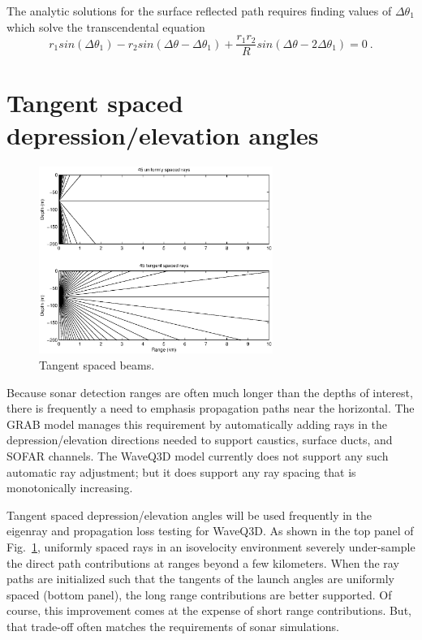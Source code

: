 \documentclass{ws-jca}
\begin{document}
The analytic solutions for the surface reflected path requires finding values of \( \Delta \theta_1 \) which solve the transcendental equation
\begin{equation}
	r_1 sin( \Delta \theta_1 ) - r_2 sin( \Delta \theta - \Delta \theta_1 ) 
		+ \frac{r_1 r_2}{R} sin( \Delta \theta - 2 \Delta \theta_1 ) = 0 \:.
	\label{eq:surf_8}
\end{equation}

\section{Tangent spaced depression/elevation angles}

\begin{figure}[th]
	\centerline{\includegraphics[width=3in]{plot_seq_rayfan.eps}} 
	\vspace*{8pt}
	\caption{Tangent spaced beams.  
	\label{fig:plot_seq_rayfan}}
\end{figure}
Because sonar detection ranges are often much longer than the depths of
interest, there is frequently a need to emphasis propagation paths near the
horizontal. The GRAB model\cite{GRAB2008} manages this requirement by
automatically adding rays in the depression/elevation directions needed to
support caustics, surface ducts, and SOFAR channels. The WaveQ3D model
currently does not support any such automatic ray adjustment; but it does
support any ray spacing that is monotonically increasing.

Tangent spaced depression/elevation angles will be used frequently in the
eigenray and propagation loss testing for WaveQ3D. As shown in the top panel of
Fig.~\ref{fig:plot_seq_rayfan}, uniformly spaced rays in an isovelocity
environment severely under-sample the direct path contributions at ranges
beyond a few kilometers. When the ray paths are initialized such that the
tangents of the launch angles are uniformly spaced (bottom panel), the long
range contributions are better supported. Of course, this improvement comes
at the expense of short range contributions. But, that trade-off often
matches the requirements of sonar simulations.
\end{document}
